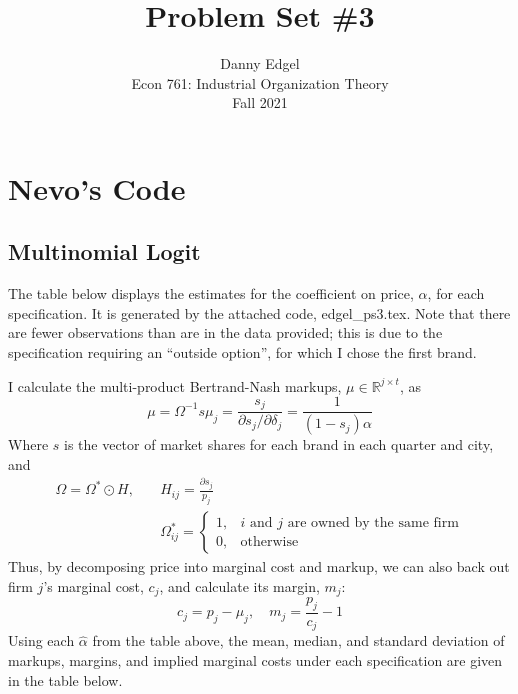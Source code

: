 \documentclass{article}
\newcommand{\R}{\mathbb{R}}
\newcommand{\pl}{\partial}
\begin{document}
\title{	Problem Set \#3 }
\author{ 	Danny Edgel 					        	      \\ 
			Econ 761: Industrial Organization Theory	\\
			Fall 2021						                      \\
		}
\maketitle\thispagestyle{empty}



\section{Nevo's Code}

\subsection*{Multinomial Logit}
The table below displays the estimates for the coefficient on price, $\alpha$, for each specification. It is generated by the attached code, edgel\_ps3.tex. Note that there are fewer observations than are in the data provided; this is due to the specification requiring an ``outside option'', for which I chose the first brand.
\begin{center}
        
\end{center}
I calculate the multi-product Bertrand-Nash markups, $\mu\in\R^{j\times t}$, as\[ 
        \mu = \Omega^{-1}s
        \mu_j = \frac{s_j}{\pl s_j / \pl\delta_j} = \frac{1}{(1-s_j)\alpha}
\]
Where ${s}$ is the vector of market shares for each brand in each quarter and city, and \begin{align*}
        \Omega = \Omega^*\odot H,\quad &H_{ij} = \frac{\pl s_j}{p_j}    \\
        &\Omega^*_{ij} =  \begin{cases} 1, & i\text{ and }j\text{ are owned by the same firm} \\ 0, &\text{otherwise} \end{cases}
\end{align*}
Thus, by decomposing price into marginal cost and markup, we can also back out firm $j$'s marginal cost, $c_j$, and calculate its margin, $m_j$: \[
        c_j = p_j - \mu_j,\quad m_j = \frac{p_j}{c_j} - 1
\]
Using each $\hat{\alpha}$ from the table above, the mean, median, and standard deviation of markups, margins, and implied marginal costs under each specification are given in the table below.
\end{document}
